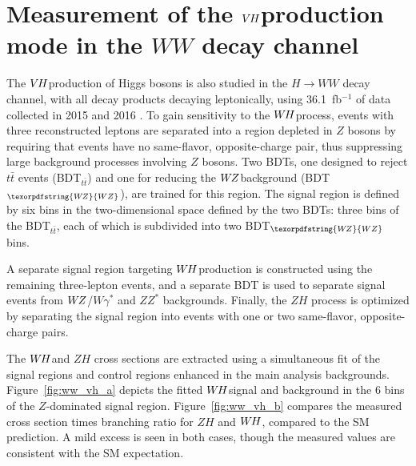 \documentclass{moriond}
\def\wh{\texorpdfstring{\ensuremath{W\kern -0.1em H}\xspace}{WH\xspace}}
\def\wz{\texorpdfstring{\ensuremath{W\kern -0.1em Z}\xspace}{WZ\xspace}}
\def\vh{\texorpdfstring{\ensuremath{V\kern -0.1em H}\xspace}{VH\xspace}}
\def\zh{\ensuremath{ZH}\xspace}
\def\ttbar{\ensuremath{t\bar{t}}\xspace}
\begin{document}
\section{Measurement of the \vh production mode in the $WW$ decay channel} \label{sec:vh_ww}

The \vh production of Higgs bosons is also studied in the $H{\rightarrow}WW$ decay channel, with all
decay products decaying leptonically,
using 36.1~fb$^{-1}$ of data collected in 2015 and 2016 \cite{HIGG-2017-14}.
To gain sensitivity to the \wh process, events with three reconstructed leptons are separated into
a region depleted in $Z$ bosons by requiring that events have no same-flavor, opposite-charge pair,
thus suppressing large background processes involving $Z$ bosons. Two BDTs, one designed to reject
\ttbar events (BDT$_\ttbar$) and one for reducing the \wz background (BDT$_\wz$), are trained for
this region. The signal region is defined by six bins in the two-dimensional space defined by the two
BDTs: three bins of the BDT$_\ttbar$, each of which is subdivided into two BDT$_\wz$ bins.

A separate signal region targeting \wh production is constructed using the remaining three-lepton
events, and a separate BDT is used to separate signal events from \wz/$W\gamma^*$ and $ZZ^*$
backgrounds. Finally, the \zh process is optimized by separating the signal region into events with
one or two same-flavor, opposite-charge pairs.

The \wh and \zh cross sections are extracted using a simultaneous fit of the signal regions and
control regions enhanced in the main analysis backgrounds.
Figure~\ref{fig:ww_vh_a} depicts the fitted \wh signal and background in the 6 bins of the
$Z$-dominated signal region.
Figure~\ref{fig:ww_vh_b} compares the measured cross section times branching ratio for $ZH$ and \wh,
compared to the SM prediction. A mild excess is seen in both cases, though the measured values are
consistent with the SM expectation.
\end{document}
